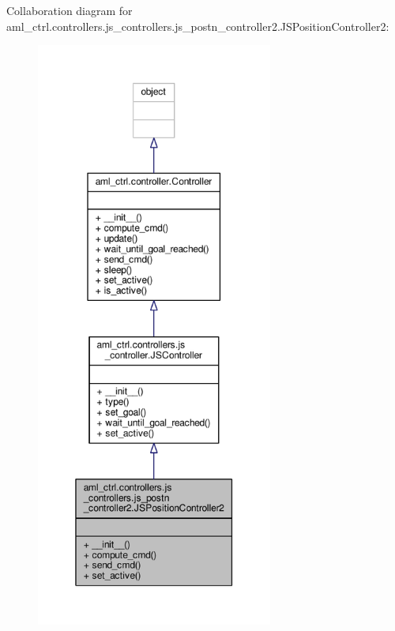 Collaboration diagram for aml\-\_\-ctrl.\-controllers.\-js\-\_\-controllers.\-js\-\_\-postn\-\_\-controller2.\-J\-S\-Position\-Controller2\-:
\nopagebreak
\begin{figure}[H]
\begin{center}
\leavevmode
\includegraphics[height=550pt]{classaml__ctrl_1_1controllers_1_1js__controllers_1_1js__postn__controller2_1_1_j_s_position_controller2__coll__graph}
\end{center}
\end{figure}
